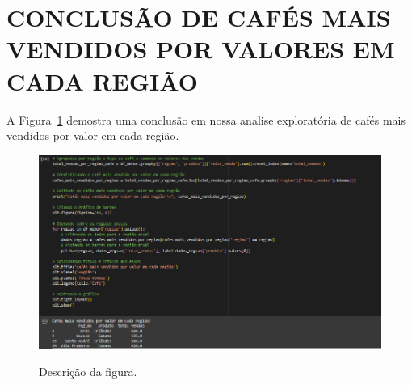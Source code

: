 \section{CONCLUSÃO DE CAFÉS MAIS VENDIDOS POR VALORES EM CADA REGIÃO}
	\label{sec:identificao}
\label{sec:figura}
A Figura~\ref{ffiguras/configuraçao-resultado-cafes-mais-vendidos-por-regiao-valores.png} demostra uma conclusão em nossa analise exploratória de cafés mais vendidos por valor em cada região.
\begin{figure}[!ht]
	{\centering
		\caption{Descrição da figura.}
		\includegraphics[width=1.0\textwidth]{figuras/configuraçao-resultado-cafes-mais-vendidos-por-regiao-valores.png}
		\label{ffiguras/configuraçao-resultado-cafes-mais-vendidos-por-regiao-valores.png}
	}
\end{figure} \\ \\ \\ \\ \\ \\ \\  \\ \\ \\ \\ \\ \\ 




		

	

